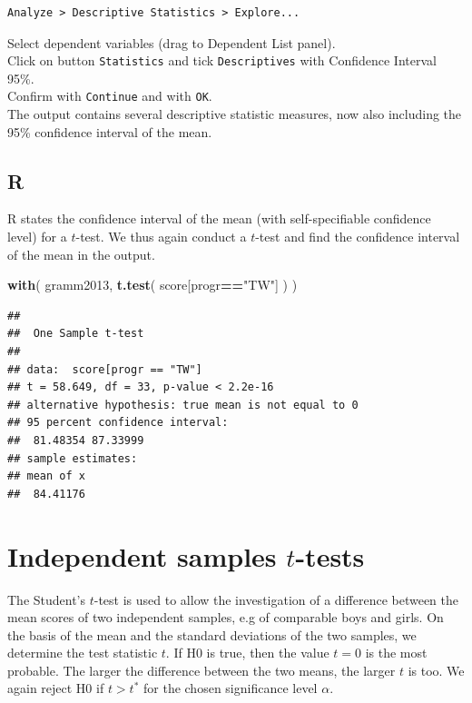\documentclass[
]{book}
\newenvironment{Shaded}{\begin{snugshade}}{\end{snugshade}}
\newcommand{\KeywordTok}[1]{\textcolor[rgb]{0.13,0.29,0.53}{\textbf{#1}}}
\newcommand{\NormalTok}[1]{#1}
\newcommand{\OperatorTok}[1]{\textcolor[rgb]{0.81,0.36,0.00}{\textbf{#1}}}
\newcommand{\StringTok}[1]{\textcolor[rgb]{0.31,0.60,0.02}{#1}}
\begin{document}
\begin{verbatim}
Analyze > Descriptive Statistics > Explore...
\end{verbatim}

Select dependent variables (drag to Dependent List panel).\\
Click on button \texttt{Statistics} and tick \texttt{Descriptives} with Confidence Interval
95\%.\\
Confirm with \texttt{Continue} and with \texttt{OK}.\\
The output contains several descriptive statistic measures, now also
including the 95\% confidence interval of the mean.

\hypertarget{r-12}{%
\subsection{R}\label{r-12}}

R states the confidence interval of the mean (with self-specifiable
confidence level) for a \(t\)-test. We thus again conduct a \(t\)-test
and find the confidence interval of the mean in the
output.

\begin{Shaded}
\begin{Highlighting}[]
\KeywordTok{with}\NormalTok{( gramm2013, }\KeywordTok{t.test}\NormalTok{( score[progr}\OperatorTok{==}\StringTok{"TW"}\NormalTok{] ) )}
\end{Highlighting}
\end{Shaded}

\begin{verbatim}
## 
##  One Sample t-test
## 
## data:  score[progr == "TW"]
## t = 58.649, df = 33, p-value < 2.2e-16
## alternative hypothesis: true mean is not equal to 0
## 95 percent confidence interval:
##  81.48354 87.33999
## sample estimates:
## mean of x 
##  84.41176
\end{verbatim}

\hypertarget{sec:ttest-indep}{%
\section{\texorpdfstring{Independent samples \(t\)-tests}{Independent samples t-tests}}\label{sec:ttest-indep}}

The Student's \(t\)-test is used to allow the investigation of a difference
between the mean scores of two independent samples, e.g of
comparable boys and girls. On the basis of the mean and the standard
deviations of the two samples, we determine the test statistic \(t\).
If H0 is true, then the value \(t=0\) is the most probable. The larger the difference
between the two means, the larger \(t\) is too. We again reject H0 if \(t>t^*\)
for the chosen significance level \(\alpha\).
\end{document}
